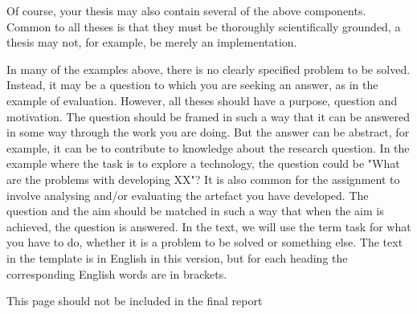 Of course, your thesis may also contain several of the above components. 
Common to all theses is that they must be thoroughly scientifically grounded, a thesis may not, for example, be merely an implementation.

In many of the examples above, there is no clearly specified problem to be solved. 
Instead, it may be a question to which you are seeking an answer, as in the example of evaluation.
However, all theses should have a purpose, question and motivation. 
The question should be framed in such a way that it can be answered in some way through the work you are doing.
But the answer can be abstract, for example, it can be to contribute to knowledge about the research question.
In the example where the task is to explore a technology, the question could be "What are the problems with developing XX"?
It is also common for the assignment to involve analysing and/or evaluating the artefact you have developed.
The question and the aim should be matched in such a way that when the aim is achieved, the question is answered.
In the text, we will use the term task for what you have to do, whether it is a problem to be solved or something else.
The text in the template is in English in this version, but for each heading the corresponding English words are in brackets.

This page should not be included in the final report
\newpage
